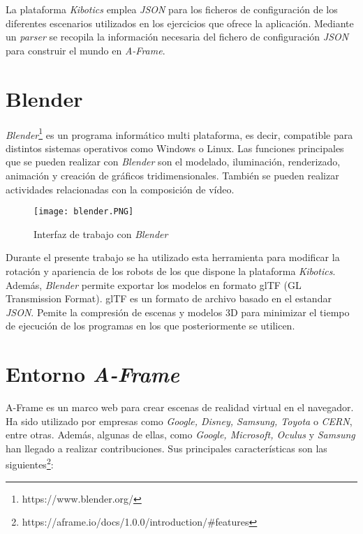 La plataforma \textit{Kibotics} emplea \textit{JSON} para los ficheros de configuración de los diferentes escenarios utilizados en los ejercicios que ofrece la aplicación. Mediante un \textit{parser} se recopila la información necesaria del fichero de configuración \textit{JSON} para construir el mundo en \textit{A-Frame}.

\section{Blender}
\textit{Blender}\footnote{https://www.blender.org/} es un programa informático multi plataforma, es decir, compatible para distintos sistemas operativos como Windows o Linux. Las funciones principales que se pueden realizar con \textit{Blender} son el modelado, iluminación, renderizado, animación y creación de gráficos tridimensionales. También se pueden realizar actividades relacionadas con la composición de vídeo. 

\begin{figure}[h!]
    \centering
    \texttt{[image: blender.PNG]} 
    \caption{Interfaz de trabajo con \textit{Blender}}
    \label{fig:blender}
\end{figure}

Durante el presente trabajo se ha utilizado esta herramienta para modificar la rotación y apariencia de los robots de los que dispone la plataforma \textit{Kibotics}. Además, \textit{Blender} permite exportar los modelos en formato glTF (GL Transmission Format). glTF es un formato de archivo basado en el estandar \textit{JSON}. Pemite la compresión de escenas y modelos 3D para minimizar el tiempo de ejecución de los programas en los que posteriormente se utilicen.

\section{Entorno \textit{A-Frame}}
A-Frame es un marco web para crear escenas de realidad virtual en el navegador. Ha sido utilizado por empresas como \textit{Google, Disney, Samsung, Toyota} o \textit{CERN}, entre otras. Además, algunas de ellas, como \textit{Google, Microsoft, Oculus} y \textit{Samsung} han llegado a realizar contribuciones. Sus principales características son las siguientes\footnote{https://aframe.io/docs/1.0.0/introduction/#features}:

